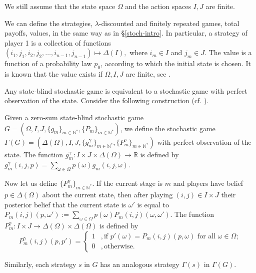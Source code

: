 \documentclass[english,openary,12pt]{article}
\theoremstyle{definition}
\newtheorem{definition}{Definition}
\newcommand{\R}{\mathbb{R}}
\newcommand{\N}{\mathbb{N}}
\begin{document}
We still assume that the state space $\Omega$ and the action spaces $I, J$ are finite.

We can define the strategies, $\lambda$-discounted and finitely repeated 
games, total payoffs, values, in the same way as in \S\ref{stoch-intro}. 
In particular, a strategy of player 1 is a
collection of functions\\
$(i_1, j_1, i_2, j_2, \ldots, i_{n-1}, j_{n-1})
\mapsto \Delta(I),$
where $i_m \in I$ and $j_m \in J$.
The value is a function of a probability law $p_0$, according to which 
the initial state is chosen. It is known that the value exists if $\Omega, I, J$ are finite, see \cite{Sor02}.

Any state-blind stochastic game is equivalent to 
a stochastic game with perfect observation of the state.
Consider the following construction (cf. \cite[\S1.3]{Zil16}). 

Given a zero-sum state-blind stochastic game 
$G = (\Omega, I, J, \{g_m\}_{m\in\N^*}, \{P_m\}_{m \in \N^*})$, 
we define the stochastic game  
$\Gamma(G) = (\Delta(\Omega), I, J, \{g_m^\gamma\}_{m\in\N^*}, 
\{P_m^\gamma\}_{m \in\N^*})$
with perfect observation of the state. The function 
$g_m^\gamma : I \times J \times \Delta(\Omega) \to \R$ is defined by
$g_m^\gamma (i,j,p) = \sum\nolimits_{\omega \in \Omega} p(\omega) 
g_m(i, j, \omega)$.

Now let us define $\{P_m^\gamma\}_{m \in\N^*}$. If the current stage is $m$ and players have belief $p \in \Delta(\Omega)$ about the current state, then after playing $(i, j) \in I \times J$ their posterior belief that the current state is $\omega'$ is equal to $P_m (i,j)(p,\omega') := \sum\nolimits_{\omega \in \Omega} p(\omega) P_m(i, j)(\omega, \omega')$. The function
$P_m^\gamma : I \times J \to \Delta(\Omega) \times \Delta(\Omega)$
is defined by 
$$P_m^\gamma (i,j)(p,p') = 
\begin{cases}
1  &,\text{if } p'(\omega) = P_m (i, j) (p, \omega)
\text{ for all } \omega \in \Omega; \\
0  &,\text{otherwise}.
\end{cases}$$

Similarly, each strategy $s$ in $G$ has an analogous strategy 
$\Gamma(s)$ in $\Gamma(G)$.

\end{document}
